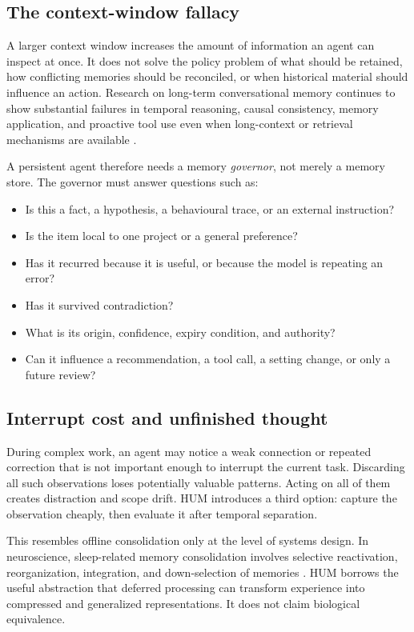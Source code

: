 \documentclass[11pt,a4paper]{article}
\begin{document}
\subsection{The context-window fallacy}

A larger context window increases the amount of information an agent can inspect at once. It does not solve the policy problem of what should be retained, how conflicting memories should be reconciled, or when historical material should influence an action. Research on long-term conversational memory continues to show substantial failures in temporal reasoning, causal consistency, memory application, and proactive tool use even when long-context or retrieval mechanisms are available \cite{maharana2024,shen2026,jia2025}.

A persistent agent therefore needs a memory \emph{governor}, not merely a memory store. The governor must answer questions such as:

\begin{itemize}
  \item Is this a fact, a hypothesis, a behavioural trace, or an external instruction?
  \item Is the item local to one project or a general preference?
  \item Has it recurred because it is useful, or because the model is repeating an error?
  \item Has it survived contradiction?
  \item What is its origin, confidence, expiry condition, and authority?
  \item Can it influence a recommendation, a tool call, a setting change, or only a future review?
\end{itemize}

\subsection{Interrupt cost and unfinished thought}

During complex work, an agent may notice a weak connection or repeated correction that is not important enough to interrupt the current task. Discarding all such observations loses potentially valuable patterns. Acting on all of them creates distraction and scope drift. HUM introduces a third option: capture the observation cheaply, then evaluate it after temporal separation.

This resembles offline consolidation only at the level of systems design. In neuroscience, sleep-related memory consolidation involves selective reactivation, reorganization, integration, and down-selection of memories \cite{diekelmann2010,klinzing2019}. HUM borrows the useful abstraction that deferred processing can transform experience into compressed and generalized representations. It does not claim biological equivalence.
\end{document}
